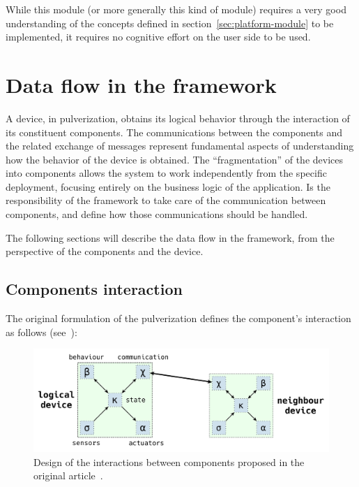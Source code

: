 While this module (or more generally this kind of module) requires a very good understanding of the concepts defined in
section~\ref{sec:platform-module} to be implemented, it requires no cognitive effort on the user side to be used.


\section{Data flow in the framework}
\label{sec:framework-data-flow}

A device, in pulverization, obtains its logical behavior through the interaction of its constituent components. The communications between the
components and the related exchange of messages represent fundamental aspects of understanding how the behavior of the device is obtained.
The ``fragmentation'' of the devices into components allows the system to work independently from the specific deployment, focusing entirely on
the business logic of the application.
Is the responsibility of the framework to take care of the communication between components, and define how those communications should be handled.

The following sections will describe the data flow in the framework, from the perspective of the components and the device.

\subsection{Components interaction}
\label{sec:framework-components-interaction}

The original formulation of the pulverization defines the component's interaction as follows (see~):

\begin{figure}
	\centering
	\includegraphics[width=\textwidth]{figures/original-components-interactions.pdf}
	\caption{Design of the interactions between components proposed in the original article~\cite{fi12110203}.}
	\label{fig:framework-components-interaction}
\end{figure}

